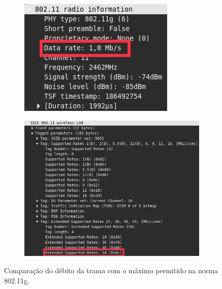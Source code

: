 \documentclass{llncs}
\begin{document}
\begin{figure}[h]
  \centering
  \begin{subfigure}{0.5\textwidth}
    \centering
    \includegraphics[width=0.95\linewidth]{./imagens/ex3_debito.png}
  \end{subfigure}%
  \begin{subfigure}{0.5\textwidth}
    \centering
    \includegraphics[width=1\linewidth]{./imagens/ex3_debito_max.png}
  \end{subfigure}%
  \caption{Comparação do débito da trama com o máximo permitido na norma 802.11g.}
  \label{fig:debito_733}
\end{figure}


\clearpage
\end{document}
